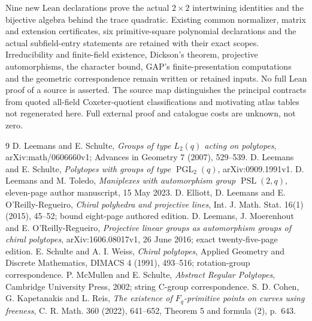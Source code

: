 \documentclass[11pt,a4paper]{article}
\newcommand{\PSL}{\operatorname{PSL}}
\newcommand{\PGL}{\operatorname{PGL}}
\begin{document}
Nine new Lean declarations prove the actual $2\times2$ intertwining
identities and the bijective algebra behind the trace quadratic. Existing
common normalizer, matrix and extension certificates, six primitive-square
polynomial declarations and the actual subfield-entry statements are
retained with their exact scopes. Irreducibility and finite-field existence,
Dickson's theorem, projective automorphisms, the character bound, GAP's
finite-presentation computations and the geometric correspondence remain
written or retained inputs. No full Lean proof of a source is asserted.
The source map distinguishes the principal contracts from quoted all-field
Coxeter-quotient classifications and motivating atlas tables not regenerated
here. Full external proof and catalogue costs are unknown, not zero.
\begin{thebibliography}{9}
 D. Leemans and E. Schulte, \emph{Groups of type $L_2(q)$ acting
on polytopes}, arXiv:math/0606660v1; Advances in Geometry 7 (2007), 529--539.
 D. Leemans and E. Schulte, \emph{Polytopes with groups of type
$\PGL_2(q)$}, arXiv:0909.1991v1.
 D. Leemans and M. Toledo, \emph{Maniplexes with automorphism
group $\PSL(2,q)$}, eleven-page author manuscript, 15 May 2023.
 D. Elliott, D. Leemans and E. O'Reilly-Regueiro,
\emph{Chiral polyhedra and projective lines}, Int. J. Math. Stat.
16(1) (2015), 45--52; bound eight-page authored edition.
 D. Leemans, J. Moerenhout and E. O'Reilly-Regueiro,
\emph{Projective linear groups as automorphism groups of chiral polytopes},
arXiv:1606.08017v1, 26 June 2016; exact twenty-five-page edition.
 E. Schulte and A. I. Weiss, \emph{Chiral polytopes},
Applied Geometry and Discrete Mathematics, DIMACS 4 (1991), 493--516;
rotation-group correspondence.
 P. McMullen and E. Schulte, \emph{Abstract Regular Polytopes},
Cambridge University Press, 2002; string C-group correspondence.
 S. D. Cohen, G. Kapetanakis and L. Reis,
\emph{The existence of $F_q$-primitive points on curves using freeness},
C. R. Math. 360 (2022), 641--652, Theorem 5 and formula (2), p.~643.
\end{thebibliography}
\end{document}
